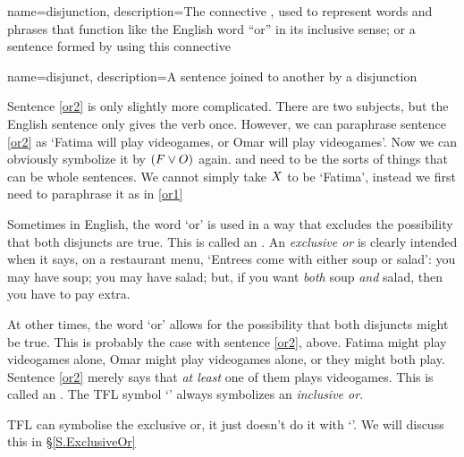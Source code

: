 {
name=disjunction,
description={The connective \eor, used to represent words and phrases that function like the English word ``or'' in its inclusive sense; or a sentence formed by using this connective}
}

{
name=disjunct,
description={A sentence joined to another by a \gls{disjunction}}
}

Sentence \ref{or2} is only slightly more complicated. There are two subjects, but the English sentence only gives the verb once. However, we can paraphrase sentence \ref{or2} as `Fatima will play videogames, or Omar will play videogames'. Now we can obviously symbolize it by $(F \vee O)$ again.
\metaX and \metaY need to be the sorts of things that can be whole sentences. We cannot simply take $X$ to be `Fatima', instead we first need to paraphrase it as in \ref{or1}
	
Sometimes in English, the word `or' is used in a way that excludes the possibility that both disjuncts are true. This is called an .  An \emph{exclusive or} is clearly intended when it says, on a restaurant menu, `Entrees come with either soup or salad': you may have soup; you may have salad; but, if you want \emph{both} soup \emph{and} salad, then you have to pay extra.

At other times, the word `or' allows for the possibility that both disjuncts might be true. This is probably the case with sentence \ref{or2}, above. Fatima might play videogames alone, Omar might play videogames alone, or they might both play. Sentence \ref{or2} merely says that \emph{at least} one of them plays videogames. This is called an . The TFL symbol `\eor' always symbolizes an \emph{inclusive or}.

TFL can symbolise the exclusive or, it just doesn't do it with `\eor'. We will discuss this in \S\ref{S.ExclusiveOr}

